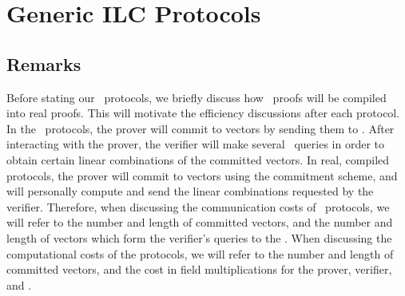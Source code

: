 \chapter{Generic ILC Protocols}
\label{chapterlabel:Generic-Protocol}

%
%
%
%
%
\section{Remarks} Before stating our \ILC \ protocols, we briefly discuss how \ILC\ proofs will be compiled into real proofs. This will motivate the efficiency discussions after each protocol. In the \ILC \ protocols, the prover will commit to vectors by sending them to \ILC. After interacting with the prover, the verifier will make several \ILC\ queries in order to obtain certain linear combinations of the committed vectors. In real, compiled protocols, the prover will commit to vectors using the commitment scheme, and will personally compute and send the linear combinations requested by the verifier. Therefore, when discussing the communication costs of \ILC \ protocols, we will refer to the number and length of committed vectors, and the number and length of vectors which form the verifier's queries to the \ILC. When discussing the computational costs of the protocols, we will refer to the number and length of committed vectors, and the cost in field multiplications for the prover, verifier, and \ILC.

